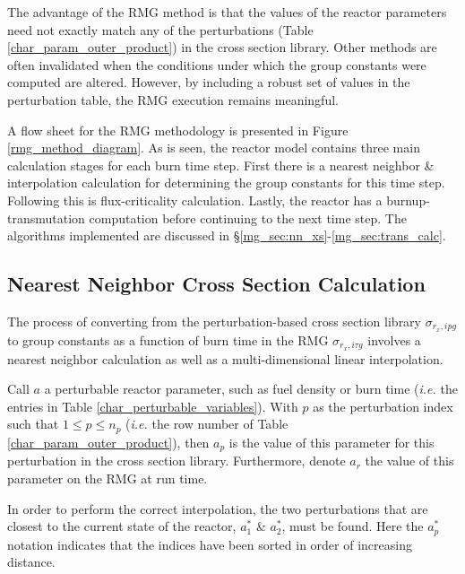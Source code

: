 The advantage of the RMG method is that the values of the reactor parameters
need not exactly match any of the perturbations (Table \ref{char_param_outer_product}) in the 
cross section library.  Other methods are often invalidated when the conditions under which 
the group constants were computed are altered.  However, by including a robust set of values
in the perturbation table, the RMG execution remains meaningful.



A flow sheet for the RMG methodology is presented in Figure \ref{rmg_method_diagram}.  As is
seen, the reactor model contains three main calculation stages for each burn time step.
First there is a nearest neighbor \& interpolation calculation for determining the group
constants for this time step.  Following this is flux-criticality calculation.  Lastly, the reactor
has a burnup-transmutation computation before continuing to the next time step.  The algorithms
implemented are discussed in \S \ref{mg_sec:nn_xs}-\ref{mg_sec:trans_calc}.


\subsection{Nearest Neighbor Cross Section Calculation}
\label{mg_sec:nn_xs}
The process of converting from the perturbation-based cross section library $\sigma_{r_x,ipg}$ to 
group constants as a function of burn time in the RMG $\sigma_{r_x,i\tau g}$ involves a nearest 
neighbor calculation as well as a multi-dimensional linear interpolation.

Call $a$ a perturbable reactor parameter, such as fuel density or burn time (\emph{i.e.} the 
entries in Table \ref{char_perturbable_variables}).   With $p$ as the perturbation index 
such that $1 \le p \le n_p$ (\emph{i.e.} the row number of Table \ref{char_param_outer_product}), 
then $a_p$ is the value of this parameter for this perturbation in the cross section library.  
Furthermore, denote $a_r$ the value of this parameter on the RMG at run time.

In order to perform the correct interpolation, the two perturbations that are closest to the current
state of the reactor, $a_1^*$ \& $a_2^*$, must be found.  Here the $a_p^*$ notation indicates that 
the indices have been sorted in order of increasing distance.  

